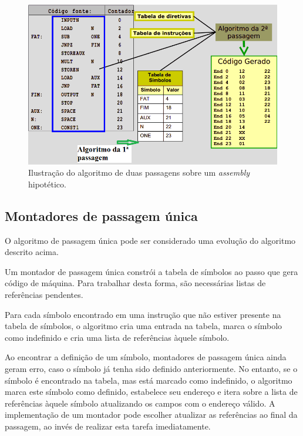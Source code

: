 \begin{figure}[ptb]
  \begin{center}
    \includegraphics[scale=.7]{imagens/duas_passagens}
  \end{center}
  \caption{Ilustração do algoritmo de duas passagens sobre um \textit{assembly}
hipotético.}
  \label{duas_passagens}
\end{figure}

\subsection{Montadores de passagem única}

O algoritmo de passagem única pode ser considerado uma evolução do algoritmo
descrito acima.

Um montador de passagem única constrói a tabela de símbolos ao passo que gera
código de máquina. Para trabalhar desta forma, são necessárias listas de
referências pendentes.

Para cada símbolo encontrado em uma instrução que não estiver presente na tabela
de símbolos, o algoritmo cria uma entrada na tabela, marca o símbolo como
indefinido e cria uma lista de referências àquele símbolo.

Ao encontrar a definição de um símbolo, montadores de passagem única ainda geram
erro, caso o símbolo já tenha sido definido anteriormente. No entanto, se o
símbolo é encontrado na tabela, mas está marcado como indefinido, o algoritmo
marca este símbolo como definido, estabelece seu endereço e itera sobre a lista
de referências àquele símbolo atualizando os campos com o endereço válido. A
implementação de um montador pode escolher atualizar as referências ao final da
passagem, ao invés de realizar esta tarefa imediatamente.

